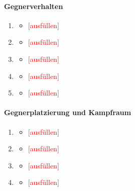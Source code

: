 \documentclass[../Main.tex]{subfiles}
\begin{document}
\paragraph{Gegnerverhalten}
\begin{enumerate}[label=\textbf{B\arabic*}, leftmargin=1.5cm, itemsep=0.8em]
    \item
        \begin{itemize}[nosep]
            \item \textcolor{red}{[ausfüllen]}
        \end{itemize}
    \item
        \begin{itemize}[nosep]
            \item \textcolor{red}{[ausfüllen]}
        \end{itemize}
    \item
        \begin{itemize}[nosep]
            \item \textcolor{red}{[ausfüllen]}
        \end{itemize}
    \item
        \begin{itemize}[nosep]
            \item \textcolor{red}{[ausfüllen]}
        \end{itemize}
    \item
        \begin{itemize}[nosep]
            \item \textcolor{red}{[ausfüllen]}
        \end{itemize}
\end{enumerate}

\paragraph{Gegnerplatzierung und Kampfraum}
\begin{enumerate}[label=\textbf{B\arabic*}, leftmargin=1.5cm, itemsep=0.8em, resume]
    \item
        \begin{itemize}[nosep]
            \item \textcolor{red}{[ausfüllen]}
        \end{itemize}
    \item
        \begin{itemize}[nosep]
            \item \textcolor{red}{[ausfüllen]}
        \end{itemize}
    \item
        \begin{itemize}[nosep]
            \item \textcolor{red}{[ausfüllen]}
        \end{itemize}
    \item
        \begin{itemize}[nosep]
            \item \textcolor{red}{[ausfüllen]}
        \end{itemize}
\end{enumerate}
\end{document}
